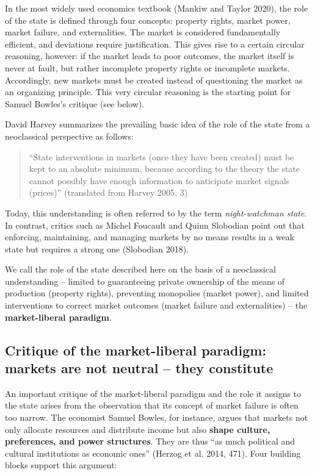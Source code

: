 \documentclass[
  british,
  a4paper,
  DIV=11,
  numbers=noendperiod,
  oneside,
  openany]{scrreprt}
\begin{document}
In the most widely used economics textbook (Mankiw and Taylor 2020), the
role of the state is defined through four concepts: property rights,
market power, market failure, and externalities. The market is
considered fundamentally efficient, and deviations require
justification. This gives rise to a certain circular reasoning, however:
if the market leads to poor outcomes, the market itself is never at
fault, but rather incomplete property rights or incomplete markets.
Accordingly, new markets must be created instead of questioning the
market as an organizing principle. This very circular reasoning is the
starting point for Samuel Bowles's critique (see below).

David Harvey summarizes the prevailing basic idea of the role of the
state from a neoclassical perspective as follows:

\begin{quote}
``State interventions in markets (once they have been created) must be
kept to an absolute minimum, because according to the theory the state
cannot possibly have enough information to anticipate market signals
(prices)'' (translated from Harvey 2005, 3)
\end{quote}

Today, this understanding is often referred to by the term
\emph{night-watchman state}. In contrast, critics such as Michel
Foucault and Quinn Slobodian point out that enforcing, maintaining, and
managing markets by no means results in a weak state but requires a
strong one (Slobodian 2018).

We call the role of the state described here on the basis of a
neoclassical understanding -- limited to guaranteeing private ownership
of the means of production (property rights), preventing monopolies
(market power), and limited interventions to correct market outcomes
(market failure and externalities) -- the \textbf{market-liberal
paradigm}.

\subsection{Critique of the market-liberal paradigm: markets are not
neutral -- they
constitute}\label{critique-of-the-market-liberal-paradigm-markets-are-not-neutral-they-constitute}

An important critique of the market-liberal paradigm and the role it
assigns to the state arises from the observation that its concept of
market failure is often too narrow. The economist Samuel Bowles, for
instance, argues that markets not only allocate resources and distribute
income but also \textbf{shape culture, preferences, and power
structures}. They are thus ``as much political and cultural institutions
as economic ones'' (Herzog et al. 2014, 471). Four building blocks
support this argument:
\end{document}
